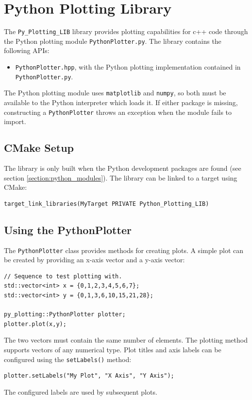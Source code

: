 \section{Python Plotting Library}\label{section:py_plotting}

The \texttt{Py\_Plotting\_LIB} library provides plotting capabilities for c++ code through the Python plotting module \texttt{PythonPlotter.py}. The library contains the following APIs:
\begin{itemize}
	\item \texttt{PythonPlotter.hpp}, with the Python plotting implementation contained in \texttt{PythonPlotter.py}.
\end{itemize}
The Python plotting module uses \texttt{matplotlib} and \texttt{numpy}, so both must be available to the Python interpreter which loads it. If either package is missing, constructing a \texttt{PythonPlotter} throws an exception when the module fails to import.

\subsection{CMake Setup}

The library is only built when the Python development packages are found (see section \ref{section:python_modules}). The library can be linked to a target using CMake:
\begin{lstlisting}[style=makestyle]
target_link_libraries(MyTarget PRIVATE Python_Plotting_LIB)
\end{lstlisting}

\subsection{Using the PythonPlotter}

The \texttt{PythonPlotter} class provides methods for creating plots. A simple plot can be created by providing an x-axis vector and a y-axis vector:
\begin{lstlisting}[style=cppstyle]
// Sequence to test plotting with.
std::vector<int> x = {0,1,2,3,4,5,6,7};
std::vector<int> y = {0,1,3,6,10,15,21,28};

py_plotting::PythonPlotter plotter;
plotter.plot(x,y);  
\end{lstlisting}
The two vectors must contain the same number of elements. The plotting method supports vectors of any numerical type. Plot titles and axis labels can be configured using the \texttt{setLabels()} method:
\begin{lstlisting}[style=cppstyle]
plotter.setLabels("My Plot", "X Axis", "Y Axis");
\end{lstlisting}
The configured labels are used by subsequent plots.

